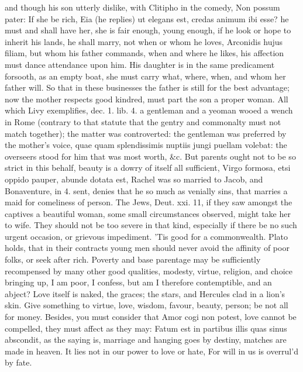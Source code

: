 {and though his son utterly dislike, with Clitipho in the comedy, Non
possum pater: If she be rich, Eia (he replies) ut elegans est, credas
animum ibi esse? he must and shall have her, she is fair enough, young
enough, if he look or hope to inherit his lands, he shall marry, not
when or whom he loves, Arconidis hujus filiam, but whom his father
commands, when and where he likes, his affection must dance attendance
upon him. His daughter is in the same predicament forsooth, as an empty
boat, she must carry what, where, when, and whom her father will. So
that in these businesses the father is still for the best advantage;
now the mother respects good kindred, must part the son a proper woman.
All which  Livy exemplifies, dec. 1. lib. 4. a gentleman and a
yeoman wooed a wench in Rome (contrary to that statute that the gentry
and commonalty must not match together); the matter was controverted:
the gentleman was preferred by the mother's voice, quae quam
splendissimis nuptiis jungi puellam volebat: the overseers stood for
him that was most worth, \&c. But parents ought not to be so strict in
this behalf, beauty is a dowry of itself all sufficient, Virgo
formosa, etsi oppido pauper, abunde dotata est, Rachel was so
married to Jacob, and Bonaventure, in 4. sent, denies that he so
much as venially sins, that marries a maid for comeliness of person.
The Jews, Deut. xxi. 11, if they saw amongst the captives a beautiful
woman, some small circumstances observed, might take her to wife. They
should not be too severe in that kind, especially if there be no such
urgent occasion, or grievous impediment. 'Tis good for a commonwealth.
Plato holds, that in their contracts young men should never avoid
the affinity of poor folks, or seek after rich. Poverty and base
parentage may be sufficiently recompensed by many other good qualities,
modesty, virtue, religion, and choice bringing up, I am poor, I
confess, but am I therefore contemptible, and an abject? Love itself is
naked, the graces; the stars, and Hercules clad in a lion's skin. Give
something to virtue, love, wisdom, favour, beauty, person; be not all
for money. Besides, you must consider that Amor cogi non potest, love
cannot be compelled, they must affect as they may: Fatum est in
partibus illis quas sinus abscondit, as the saying is, marriage and
hanging goes by destiny, matches are made in heaven.
It lies not in our power to love or hate,
For will in us is overrul'd by fate.

}
